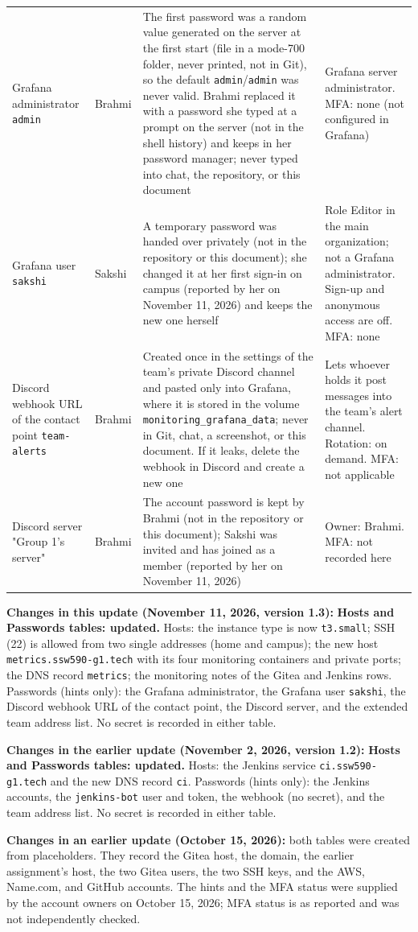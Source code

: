\begin{tabularx}{\linewidth}{L{3.0cm}L{1.8cm}YL{3.2cm}}
Grafana administrator \texttt{admin} & Brahmi & The first password was a random value generated on the server at the first start (file in a mode-700 folder, never printed, not in Git), so the default \texttt{admin}/\texttt{admin} was never valid. Brahmi replaced it with a password she typed at a prompt on the server (not in the shell history) and keeps in her password manager; never typed into chat, the repository, or this document & Grafana server administrator. MFA: none (not configured in Grafana)\\
Grafana user \texttt{sakshi} & Sakshi & A temporary password was handed over privately (not in the repository or this document); she changed it at her first sign-in on campus (reported by her on November 11, 2026) and keeps the new one herself & Role Editor in the main organization; not a Grafana administrator. Sign-up and anonymous access are off. MFA: none\\
Discord webhook URL of the contact point \texttt{team-alerts} & Brahmi & Created once in the settings of the team's private Discord channel and pasted only into Grafana, where it is stored in the volume \texttt{monitoring\_grafana\_data}; never in Git, chat, a screenshot, or this document. If it leaks, delete the webhook in Discord and create a new one & Lets whoever holds it post messages into the team's alert channel. Rotation: on demand. MFA: not applicable\\
Discord server "Group 1's server" & Brahmi & The account password is kept by Brahmi (not in the repository or this document); Sakshi was invited and has joined as a member (reported by her on November 11, 2026) & Owner: Brahmi. MFA: not recorded here\\
\end{tabularx}
\textbf{Changes in this update (November 11, 2026, version 1.3):} \textbf{Hosts and Passwords tables: updated.}
Hosts: the instance type is now \texttt{t3.small}; SSH (22) is allowed from two single addresses (home and campus); the new host \texttt{metrics.ssw590-g1.tech} with its
four monitoring containers and private ports; the DNS record \texttt{metrics}; the monitoring notes of the Gitea and Jenkins rows. Passwords (hints only): the Grafana administrator,
the Grafana user \texttt{sakshi}, the Discord webhook URL of the contact point, the Discord server, and the extended team address list. No secret is recorded in either table.

\textbf{Changes in the earlier update (November 2, 2026, version 1.2):} \textbf{Hosts and Passwords tables: updated.}
Hosts: the Jenkins service \texttt{ci.ssw590-g1.tech} and the new DNS record \texttt{ci}. Passwords (hints only): the
Jenkins accounts, the \texttt{jenkins-bot} user and token, the webhook (no secret), and the team address list. No secret
is recorded in either table.

\textbf{Changes in an earlier update (October 15, 2026):} both tables were created from
placeholders. They record the Gitea host, the domain, the earlier assignment's
host, the two Gitea users, the two SSH keys, and the AWS, Name.com, and GitHub
accounts. The hints and the MFA status were supplied by the account owners on October 15, 2026; MFA status is as reported and was not independently checked.
